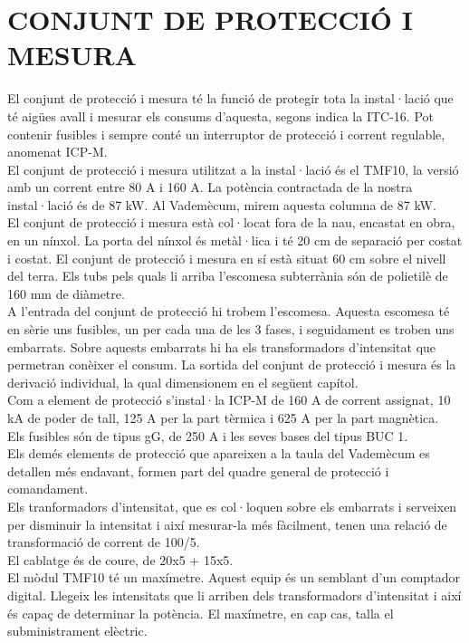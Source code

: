 \chapter{\uppercase{Conjunt de protecció i mesura}}
El conjunt de protecció i mesura té la funció de protegir tota la instal·lació que té aigües avall i mesurar els consums d'aquesta, segons indica la ITC-16. Pot contenir fusibles i sempre conté un interruptor de protecció i corrent regulable, anomenat ICP-M.\\
\newline El conjunt de protecció i mesura utilitzat a la instal·lació és el TMF10, la versió amb un corrent entre 80 A i 160 A. La potència contractada de la nostra instal·lació és de 87 kW. Al Vademècum, mirem aquesta columna de 87 kW.\\
\newline
El conjunt de protecció i mesura està col·locat fora de la nau, encastat en obra, en un nínxol. La porta del nínxol és metàl·lica i té 20 cm de separació per costat i costat. El conjunt de protecció i mesura en sí està situat 60 cm sobre el nivell del terra. Els tubs pels quals li arriba l'escomesa subterrània són de polietilè de 160 mm de diàmetre.\\
\newline
A l'entrada del conjunt de protecció hi trobem l'escomesa. Aquesta escomesa té en sèrie uns fusibles, un per cada una de les 3 fases, i seguidament es troben uns embarrats. Sobre aquests embarrats hi ha els transformadors d'intensitat que permetran conèixer el consum. La sortida del conjunt de protecció i mesura és la derivació individual, la qual dimensionem en el següent capítol.\\
\newline
Com a element de protecció s'instal·la ICP-M de 160 A de corrent assignat, 10 kA de poder de tall, 125 A per la part tèrmica i 625 A per la part magnètica.\\
\newline Els fusibles són de tipus gG, de 250 A i les seves bases del tipus BUC 1.\\
\newline Els demés elements de protecció que apareixen a la taula del Vademècum es detallen més endavant, formen part del quadre general de protecció i comandament.\\
\newline Els tranformadors d'intensitat, que es col·loquen sobre els embarrats i serveixen per disminuir la intensitat i així mesurar-la més fàcilment, tenen una relació de transformació de corrent de 100/5.\\
\newline El cablatge és de coure, de 20x5 + 15x5.\\
\newline El mòdul TMF10 té un maxímetre. Aquest equip és un semblant d'un comptador digital. Llegeix les intensitats que li arriben dels transformadors d'intensitat i així és capaç de determinar la potència. El maxímetre, en cap cas, talla el subministrament elèctric.


\clearpage